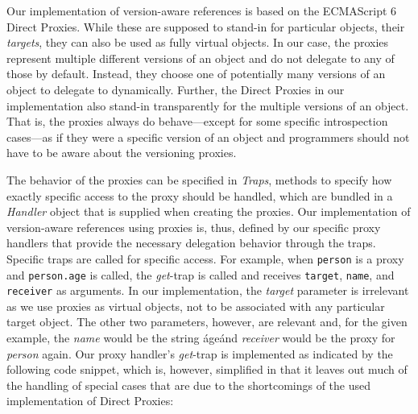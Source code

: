 Our implementation of version-aware references is based on the ECMAScript 6 Direct Proxies.
While these are supposed to stand-in for particular objects, their \emph{targets}, they can also be used as fully virtual objects.
In our case, the proxies represent multiple different versions of an object and do not delegate to any of those by default.
Instead, they choose one of potentially many versions of an object to delegate to dynamically.
Further, the Direct Proxies in our implementation also stand-in transparently for the multiple versions of an object.
That is, the proxies always do behave---except for some specific introspection cases---as if they were a specific version of an object and programmers should not have to be aware about the versioning proxies.

The behavior of the proxies can be specified in \emph{Traps}, methods to specify how exactly specific access to the proxy should be handled, which are bundled in a \emph{Handler} object that is supplied when creating the proxies.
Our implementation of version-aware references using proxies is, thus, defined by our specific proxy handlers that provide the necessary delegation behavior through the traps.
Specific traps are called for specific access. 
For example, when \lstinline{person} is a proxy and \lstinline{person.age} is called, the \emph{get}-trap is called and receives \lstinline{target}, \lstinline{name}, and \lstinline{receiver} as arguments.
In our implementation, the \emph{target} parameter is irrelevant as we use proxies as virtual objects, not to be associated with any particular target object.
The other two parameters, however, are relevant and, for the given example, the \emph{name} would be the string \'age\' and \emph{receiver} would be the proxy for \emph{person} again.
Our proxy handler's \emph{get}-trap is implemented as indicated by the following code snippet, which is, however, simplified in that it leaves out much of the handling of special cases that are due to the shortcomings of the used implementation of Direct Proxies:

\iffalse
\begin{verbatim}\fi
\begin{code}{}{}
get: function(dummyTarget, name, receiver) {

    var version = this.currentVersion();
    
    // proxy meta information and other special cases..
    if (name === 'isProxy') {
    // ...
    if (name === 'proxyTarget') {
    // ...
    
    result = version[name];
    
    return this.ensureProxied(result);
}
\end{code}
\iffalse
\end{verbatim}\fi

